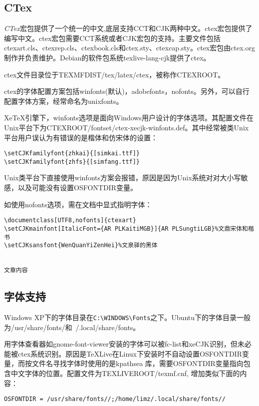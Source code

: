 
\subsection{CTex}

\emph{CTex}宏包提供了一个统一的中文,底层支持CCT和CJK两种中文。ctex宏包提供了编写中文。ctex宏包需要CCT系统或者CJK宏包的支持。主要文件包括ctexart.cls、ctexrep.cls、ctexbook.cls和ctex.sty、ctexcap.sty。ctex宏包由ctex.org制作并负责维护。Debian的软件包系统texlive-lang-cjk提供了ctex。

ctex文件目录位于TEXMFDIST/tex/latex/ctex，被称作CTEXROOT。

ctex的字体配置方案包括winfonts(默认)，adobefonts，nofonts。另外，可以自行配置字体方案，经常命名为unixfonts。

XeTeX引擎下，winfonts选项是面向Windows用户设计的字体选项。其配置文件在Unix平台下为CTEXROOT/fontset/ctex-xecjk-winfonts.def。其中经常被类Unix平台用户误认为有错误的是楷体和仿宋体的设置：
\begin{verbatim}
\setCJKfamilyfont{zhkai}{[simkai.ttf]}
\setCJKfamilyfont{zhfs}{[simfang.ttf]}
\end{verbatim}
Unix类平台下直接使用winfonts方案会报错，原因是因为Unix系统对对大小写敏感，以及可能没有设置OSFONTDIR变量。

如使用nofonts选项，需在文档中显式指明字体：
\begin{verbatim}
\documentclass[UTF8,nofonts]{ctexart}
\setCJKmainfont[ItalicFont={AR PLKaitiMGB}]{AR PLSungtiLGB}%文鼎宋体和楷书
\setCJKsansfont{WenQuanYiZenHei}%文泉驿的黑体


文章内容

\end{verbatim}

\subsection{字体支持}
Windows XP下的字体目录在\verb|C:\WINDOWS\Fonts|之下。Ubuntu下的字体目录一般为/usr/share/fonts/和~/.local/share/fonts。

用字体查看器如gnome-font-viewer安装的字体可以被fc-list和xeCJK识别，但未必能被ctex系统识别。原因是TeXLive在Linux下安装时不自动设置OSFONTDIR变量，而按文件名寻找字体时使用的是kpathsea 库，需要OSFONTDIR变量指向包含中文字体的位置。配置文件为TEXLIVEROOT/texmf.cnf, 增加类似下面的内容：
\begin{verbatim}
OSFONTDIR = /usr/share/fonts//;/home/limz/.local/share/fonts//
\end{verbatim}










